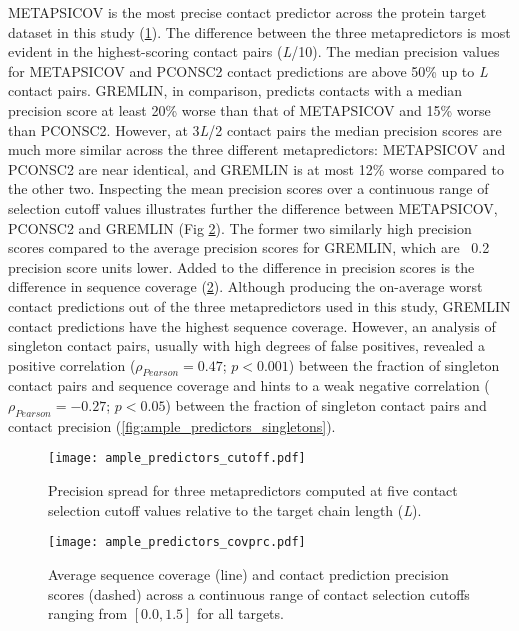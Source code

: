 METAPSICOV is the most precise contact predictor across the protein target dataset in this study (\cref{fig:ample_predictors_cutoff}). The difference between the three metapredictors is most evident in the highest-scoring contact pairs (\textit{L}/10). The median precision values for METAPSICOV and PCONSC2 contact predictions are above 50\% up to \textit{L} contact pairs. GREMLIN, in comparison, predicts contacts with a median precision score at least 20\% worse than that of METAPSICOV and 15\% worse than PCONSC2. However, at 3\textit{L}/2 contact pairs the median precision scores are much more similar across the three different metapredictors: METAPSICOV and PCONSC2 are near identical, and GREMLIN is at most 12\% worse compared to the other two. Inspecting the mean precision scores over a continuous range of selection cutoff values illustrates further the difference between METAPSICOV, PCONSC2 and GREMLIN (Fig \ref{fig:ample_predictors_covprc}). The former two similarly high precision scores compared to the average precision scores for GREMLIN, which are ~0.2 precision score units lower. Added to the difference in precision scores is the difference in sequence coverage (\cref{fig:ample_predictors_covprc}). Although producing the on-average worst contact predictions out of the three metapredictors used in this study, GREMLIN contact predictions have the highest sequence coverage. However, an analysis of singleton contact pairs, usually with high degrees of false positives, revealed a positive correlation ($\rho_{Pearson}=0.47$; $p<0.001$) between the fraction of singleton contact pairs and sequence coverage and hints to a weak negative correlation ($\rho_{Pearson}=-0.27$; $p<0.05$) between the fraction of singleton contact pairs and contact precision (\cref{fig:ample_predictors_singletons}).

\begin{figure}[H]
    \centering
    \texttt{[image: ample\_predictors\_cutoff.pdf]}
    \caption{Precision spread for three metapredictors computed at five contact selection cutoff values relative to the target chain length (\textit{L}).}
    \label{fig:ample_predictors_cutoff}
\end{figure}

\begin{figure}[H]
    \centering
    \texttt{[image: ample\_predictors\_covprc.pdf]}
    \caption{Average sequence coverage (line) and contact prediction precision scores (dashed) across a continuous range of contact selection cutoffs ranging from $[0.0, 1.5]$ for all targets.}
    \label{fig:ample_predictors_covprc}
\end{figure}

